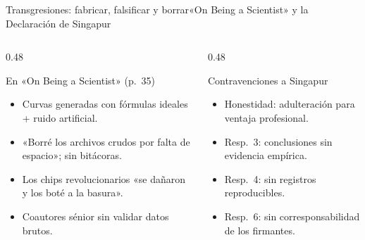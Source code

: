 \documentclass[11pt,aspectratio=169,xcolor=table]{beamer}
\begin{document}
\begin{frame}{Transgresiones: fabricar, falsificar y borrar}{«On Being a Scientist» y la Declaración de Singapur}
  \begin{columns}[T,onlytextwidth]
    \begin{column}{0.48\textwidth}
      \begin{alertblock}{En «On Being a Scientist» (p.~35)}
        \begin{itemize}
          \item Curvas generadas con fórmulas ideales + ruido artificial.
          \item «Borré los archivos crudos por falta de espacio»; sin bitácoras.
          \item Los chips revolucionarios «se dañaron y los boté a la basura».
          \item Coautores sénior sin validar datos brutos.
        \end{itemize}
      \end{alertblock}
    \end{column}
    \begin{column}{0.48\textwidth}
      \begin{block}{Contravenciones a Singapur}
        \begin{itemize}
          \item Honestidad: adulteración para ventaja profesional.
          \item Resp.~3: conclusiones sin evidencia empírica.
          \item Resp.~4: sin registros reproducibles.
          \item Resp.~6: sin corresponsabilidad de los firmantes.
        \end{itemize}
      \end{block}
    \end{column}
  \end{columns}
\end{frame}
\end{document}
